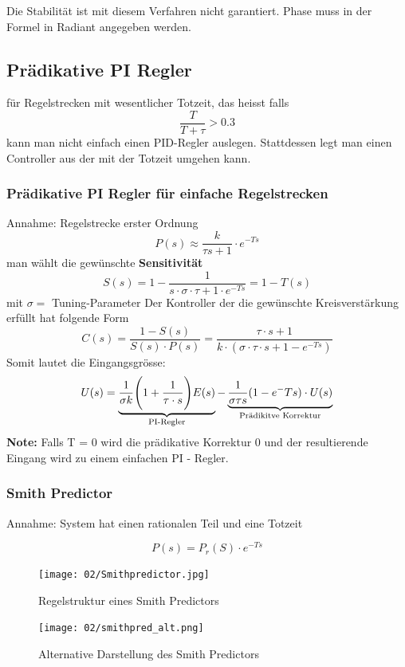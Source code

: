         Die Stabilität ist mit diesem Verfahren nicht garantiert. Phase muss in der Formel in Radiant angegeben werden. 
\subsection{Prädikative PI Regler}
    für Regelstrecken mit wesentlicher Totzeit, das heisst falls 
    \[\frac{T}{T+\tau}>0.3\]
    kann man nicht einfach einen PID-Regler auslegen. Stattdessen legt man einen Controller aus der mit der Totzeit umgehen kann. 

    
    \subsubsection{Prädikative PI Regler für einfache Regelstrecken}
        Annahme: Regelstrecke erster Ordnung 
        \[P(s)\approx \frac{k}{\tau s + 1}\cdot e^{-Ts}\]
        man wählt die gewünschte \textbf{Sensitivität} 
        \[S(s) = 1- \frac{1}{s\cdot\sigma\cdot \tau + 1 \cdot e^{-Ts}} = 1 - T(s) \]
        mit $\sigma = $ Tuning-Parameter
        Der Kontroller der die gewünschte Kreisverstärkung erfüllt hat folgende Form 
        \[C(s) =\frac{1-S(s)}{S(s)\cdot P(s)}= \frac{\tau\cdot s+1}{k\cdot(\sigma\cdot\tau\cdot s+ 1-e^{-Ts})}\]
        Somit lautet die Eingangsgrösse: 
        \[U(s)=\underbrace{\frac{1}{\sigma k}\Bigg(1+\frac{1}{\tau\cdot s}\Bigg)E(s)}_{\textnormal{PI-Regler}} - \underbrace{\frac{1}{\sigma\tau s}(1-e^-{Ts})\cdot U(s)}_{\textnormal{Prädikitve Korrektur}}\] 
        \textbf{Note:} Falls T = 0 wird die prädikative Korrektur 0 und der resultierende Eingang wird zu einem einfachen PI - Regler.
    
    \subsubsection{Smith Predictor}
        Annahme: System hat einen rationalen Teil und eine Totzeit
        
        \[P(s) = P_r(S)\cdot e^{-Ts}\]
        \begin{figure}[H]
            \centering
            \texttt{[image: 02/Smithpredictor.jpg]}
            \caption{Regelstruktur eines Smith Predictors}
        \end{figure}
        \begin{figure}[H]
            \centering
            \texttt{[image: 02/smithpred\_alt.png]}
            \caption{Alternative Darstellung des Smith Predictors}
        \end{figure}
        
